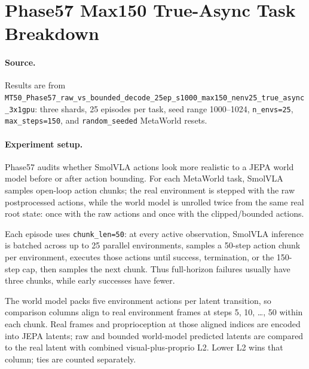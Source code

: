 \section{Phase57 Max150 True-Async Task Breakdown}
\label{sec:phase57-max150-task-breakdown}

\paragraph{Source.}
Results are from \texttt{MT50\_Phase57\_raw\_vs\_bounded\_decode\_25ep\_s1000\_max150\_nenv25\_true\_async\_3x1gpu}: three shards, 25 episodes per task, seed range 1000--1024, \texttt{n\_envs=25}, \texttt{max\_steps=150}, and \texttt{random\_seeded} MetaWorld resets.

\paragraph{Experiment setup.}
Phase57 audits whether SmolVLA actions look more realistic to a JEPA world model before or after action bounding. For each MetaWorld task, SmolVLA samples open-loop action chunks; the real environment is stepped with the raw postprocessed actions, while the world model is unrolled twice from the same real root state: once with the raw actions and once with the clipped/bounded actions.

Each episode uses \texttt{chunk\_len=50}: at every active observation, SmolVLA inference is batched across up to 25 parallel environments, samples a 50-step action chunk per environment, executes those actions until success, termination, or the 150-step cap, then samples the next chunk. Thus full-horizon failures usually have three chunks, while early successes have fewer.

The world model packs five environment actions per latent transition, so comparison columns align to real environment frames at steps 5, 10, \ldots, 50 within each chunk. Real frames and proprioception at those aligned indices are encoded into JEPA latents; raw and bounded world-model predicted latents are compared to the real latent with combined visual-plus-proprio L2. Lower L2 wins that column; ties are counted separately.


